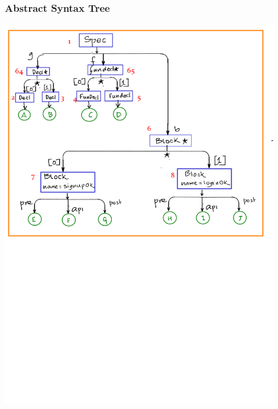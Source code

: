 \documentclass[12pts, a4paper]{article}
\begin{document}
\subsubsection{Abstract Syntax Tree}
\begin{center}
\includegraphics[width=0.9\textwidth]{../images/spec-AST-2.png}

\end{center}
\end{document}
